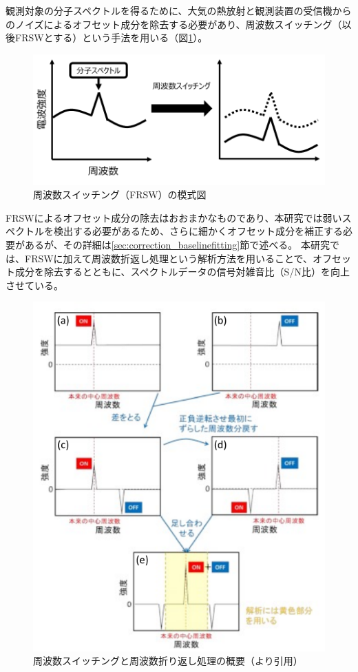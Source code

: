 観測対象の分子スペクトルを得るために、大気の熱放射と観測装置の受信機からのノイズによるオフセット成分を除去する必要があり、周波数スイッチング（以後FRSWとする）という手法を用いる（図\ref{fig:frsw_schema}）。
\begin{figure}[htbp]
    \centering
    \includegraphics[width=\linewidth]{master_thesis_contents/master_thesis_fig/frsw_schema.pdf}
    \caption{周波数スイッチング（FRSW）の模式図}
    \label{fig:frsw_schema}
\end{figure}
FRSWによるオフセット成分の除去はおおまかなものであり、本研究では弱いスペクトルを検出する必要があるため、さらに細かくオフセット成分を補正する必要があるが、その詳細は\ref{sec:correction_baselinefitting}節で述べる。
本研究では、FRSWに加えて周波数折返し処理という解析方法を用いることで、オフセット成分を除去するとともに、スペクトルデータの信号対雑音比（S/N比）を向上させている。
\begin{figure}[htbp]
    \centering
    \includegraphics[width=\linewidth]{master_thesis_contents/master_thesis_fig/frsw_process.pdf}
    \caption{周波数スイッチングと周波数折り返し処理の概要（\cite{ito2017master}より引用）}
    \label{fig:frsw_process}
\end{figure}
